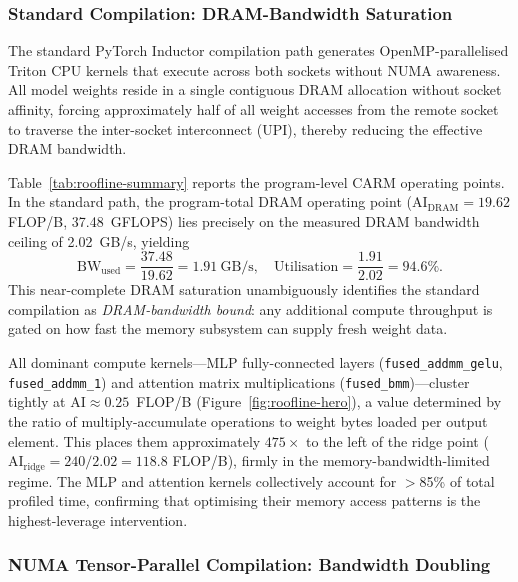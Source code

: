 \subsubsection{Standard Compilation: DRAM-Bandwidth Saturation}
\label{subsubsec:roofline-standard}

The standard PyTorch Inductor compilation path generates OpenMP-parallelised
Triton CPU kernels that execute across both sockets without NUMA awareness.
All model weights reside in a single contiguous DRAM allocation without socket
affinity, forcing approximately half of all weight accesses from the remote
socket to traverse the inter-socket interconnect (UPI), thereby reducing the
effective DRAM bandwidth.

Table~\ref{tab:roofline-summary} reports the program-level CARM operating
points.  In the standard path, the program-total DRAM operating point
($\text{AI}_{\text{DRAM}}{=}19.62$ FLOP/B, 37.48~GFLOPS) lies precisely on
the measured DRAM bandwidth ceiling of 2.02~GB/s, yielding
\begin{equation}
  \text{BW}_{\text{used}} = \frac{37.48}{19.62} = 1.91~\text{GB/s},
  \quad
  \text{Utilisation} = \frac{1.91}{2.02} = 94.6\%.
  \label{eq:dram-util}
\end{equation}
This near-complete DRAM saturation unambiguously identifies the standard
compilation as \emph{DRAM-bandwidth bound}: any additional compute throughput
is gated on how fast the memory subsystem can supply fresh weight data.

All dominant compute kernels---MLP fully-connected layers
(\texttt{fused\_addmm\_gelu}, \texttt{fused\_addmm\_1}) and attention
matrix multiplications (\texttt{fused\_bmm})---cluster tightly at
$\text{AI} \approx 0.25$~FLOP/B (Figure~\ref{fig:roofline-hero}), a value
determined by the ratio of multiply-accumulate operations to weight bytes
loaded per output element.  This places them approximately $475\times$ to the
left of the ridge point
($\text{AI}_{\text{ridge}} = 240 / 2.02 = 118.8$ FLOP/B), firmly in the
memory-bandwidth-limited regime.  The MLP and attention kernels collectively
account for $>$85\% of total profiled time, confirming that optimising their
memory access patterns is the highest-leverage intervention.

\subsubsection{NUMA Tensor-Parallel Compilation: Bandwidth Doubling}
\label{subsubsec:roofline-numa}

